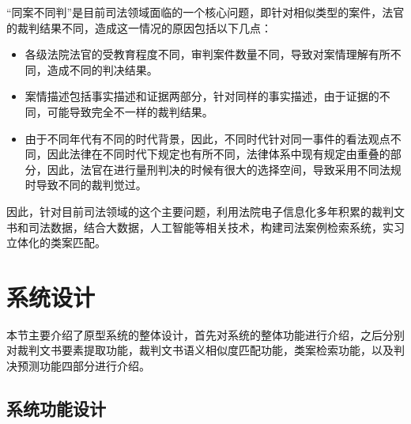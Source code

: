 “同案不同判”是目前司法领域面临的一个核心问题，即针对相似类型的案件，法官的裁判结果不同，造成这一情况的原因包括以下几点：
\begin{itemize}
    \item 各级法院法官的受教育程度不同，审判案件数量不同，导致对案情理解有所不同，造成不同的判决结果。
    \item 案情描述包括事实描述和证据两部分，针对同样的事实描述，由于证据的不同，可能导致完全不一样的裁判结果。
    \item 由于不同年代有不同的时代背景，因此，不同时代针对同一事件的看法观点不同，因此法律在不同时代下规定也有所不同，法律体系中现有规定由重叠的部分，因此，法官在进行量刑判决的时候有很大的选择空间，导致采用不同法规时导致不同的裁判觉过。
\end{itemize}


因此，针对目前司法领域的这个主要问题，利用法院电子信息化多年积累的裁判文书和司法数据，结合大数据，人工智能等相关技术，构建司法案例检索系统，实习立体化的类案匹配。


\section{系统设计}

本节主要介绍了原型系统的整体设计，首先对系统的整体功能进行介绍，之后分别对裁判文书要素提取功能，裁判文书语义相似度匹配功能，类案检索功能，以及判决预测功能四部分进行介绍。

\subsection{系统功能设计}

